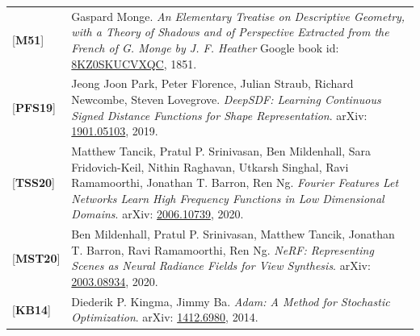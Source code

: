 \documentclass[12pt,a4paper]{article}
\theoremstyle{definition}
\begin{document}
\begin{tabular}{p{}p{}}
{[\textbf{M51}]}        & Gaspard Monge. \textit{An Elementary Treatise on Descriptive Geometry, with a Theory of Shadows and of Perspective Extracted from the French of G. Monge by J. F. Heather} Google book id: \href{https://archive.org/details/bub_gb_8KZ0SKUCVXQC/page/n17/mode/2up}{8KZ0SKUCVXQC}, 1851. \hypertarget{[M51]}{}  \\
{[\textbf{PFS19}]}      & Jeong Joon Park, Peter Florence, Julian Straub, Richard Newcombe, Steven Lovegrove. \textit{DeepSDF: Learning Continuous Signed Distance Functions for Shape Representation}. arXiv: \href{https://arxiv.org/abs/1901.05103}{1901.05103}, 2019. \hypertarget{[PFS19]}{}\\
{[\textbf{TSS20}]}      & Matthew Tancik, Pratul P. Srinivasan, Ben Mildenhall, Sara Fridovich-Keil, Nithin Raghavan, Utkarsh Singhal, Ravi Ramamoorthi, Jonathan T. Barron, Ren Ng. \textit{Fourier Features Let Networks Learn High Frequency Functions in Low Dimensional Domains}. arXiv: \href{https://arxiv.org/abs/2006.10739}{2006.10739}, 2020. \hypertarget{[TSS20]}{}\\
{[\textbf{MST20}]}      & Ben Mildenhall, Pratul P. Srinivasan, Matthew Tancik, Jonathan T. Barron, Ravi Ramamoorthi, Ren Ng. \textit{NeRF: Representing Scenes as Neural Radiance Fields for View Synthesis}. arXiv: \href{https://arxiv.org/abs/2003.08934}{2003.08934}, 2020. \hypertarget{[MST20]}{}\\
{[\textbf{KB14}]}       & Diederik P. Kingma, Jimmy Ba. \textit{Adam: A Method for Stochastic Optimization}. arXiv: \href{https://arxiv.org/abs/1412.6980}{1412.6980}, 2014. \hypertarget{[KB14]}{}\\
\end{tabular}
\end{document}
